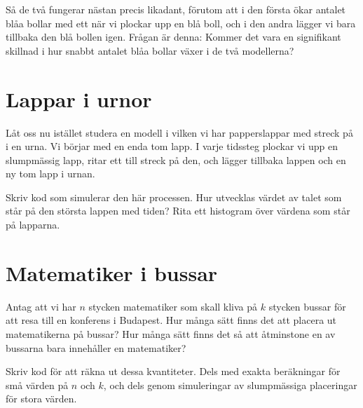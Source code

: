 \documentclass[nobib]{tufte-handout}
\begin{document}
\begin{xca}
\begin{enumerate}
        Så de två fungerar nästan precis likadant, förutom att i den första ökar antalet blåa bollar med ett när vi plockar upp en blå boll, och i den andra lägger vi bara tillbaka den blå bollen igen. Frågan är denna: Kommer det vara en signifikant skillnad i hur snabbt antalet blåa bollar växer i de två modellerna?
    \end{enumerate}
\end{xca}

\section{Lappar i urnor}

Låt oss nu istället studera en modell i vilken vi har papperslappar med streck på i en urna. Vi börjar med en enda tom lapp. I varje tidssteg plockar vi upp en slumpmässig lapp, ritar ett till streck på den, och lägger tillbaka lappen och en ny tom lapp i urnan.

\begin{xca}
    Skriv kod som simulerar den här processen. Hur utvecklas värdet av talet som står på den största lappen med tiden? Rita ett histogram över värdena som står på lapparna.
\end{xca}

\section{Matematiker i bussar}

Antag att vi har $n$ stycken matematiker som skall kliva på $k$ stycken bussar för att resa till en konferens i Budapest. Hur många sätt finns det att placera ut matematikerna på bussar? Hur många sätt finns det så att åtminstone en av bussarna bara innehåller en matematiker?

\begin{xca}
    Skriv kod för att räkna ut dessa kvantiteter. Dels med exakta beräkningar för små värden på $n$ och $k$, och dels genom simuleringar av slumpmässiga placeringar för stora värden.
\end{xca}
\end{document}
